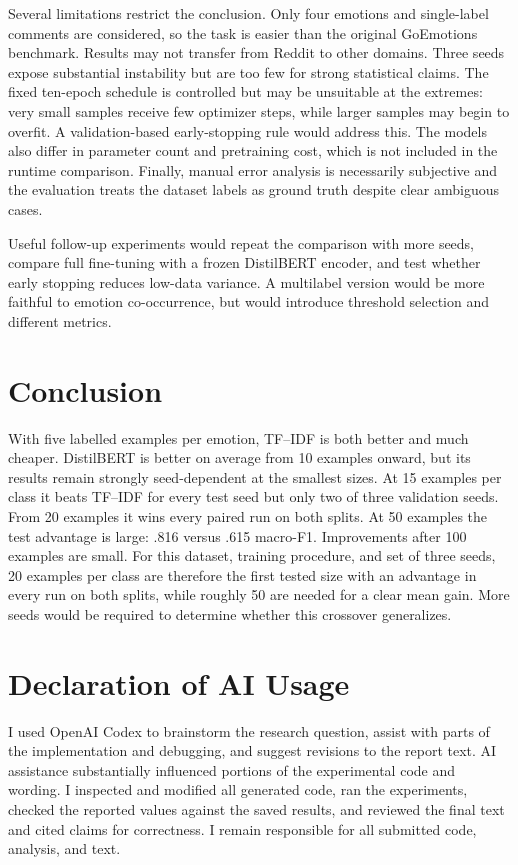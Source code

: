 \documentclass[11pt,a4paper]{article}
\begin{document}
Several limitations restrict the conclusion. Only four emotions and
single-label comments are considered, so the task is easier than
the original GoEmotions benchmark. Results may not transfer from Reddit to
other domains. Three seeds expose substantial instability but are too few for
strong statistical claims. The fixed ten-epoch schedule is controlled but may
be unsuitable at the extremes: very small samples receive few optimizer steps,
while larger samples may begin to overfit. A validation-based early-stopping
rule would address this. The models also differ in parameter count and
pretraining cost, which is not included in the runtime comparison. Finally,
manual error analysis is necessarily subjective and the evaluation treats the
dataset labels as ground truth despite clear ambiguous cases.

Useful follow-up experiments would repeat the comparison with more seeds,
compare full fine-tuning with a frozen DistilBERT encoder, and test whether
early stopping reduces low-data variance. A multilabel version would be more
faithful to emotion co-occurrence, but would introduce threshold selection and
different metrics.

\section{Conclusion}

With five labelled examples per emotion, TF--IDF is both better and much cheaper. DistilBERT is
better on average from 10 examples onward, but its results remain strongly
seed-dependent at the smallest sizes. At 15 examples per class it beats TF--IDF
for every test seed but only two of three validation seeds. From 20 examples it
wins every paired run on both splits. At 50 examples the test advantage is
large: .816 versus .615 macro-F1. Improvements after 100 examples are small.
For this dataset, training procedure, and set of three seeds, 20 examples per
class are therefore the first tested size with an advantage in every run on both
splits, while roughly 50 are needed for a clear mean gain. More seeds would be
required to determine whether this crossover generalizes.

\clearpage



\section*{Declaration of AI Usage}

I used OpenAI Codex to brainstorm the research question, assist with parts of
the implementation and debugging, and suggest revisions to the report text.
AI assistance substantially influenced portions of the experimental code and
wording. I inspected and modified all generated code, ran the experiments,
checked the reported values against the saved results, and reviewed the final
text and cited claims for correctness. I remain responsible for all submitted
code, analysis, and text.
\end{document}
